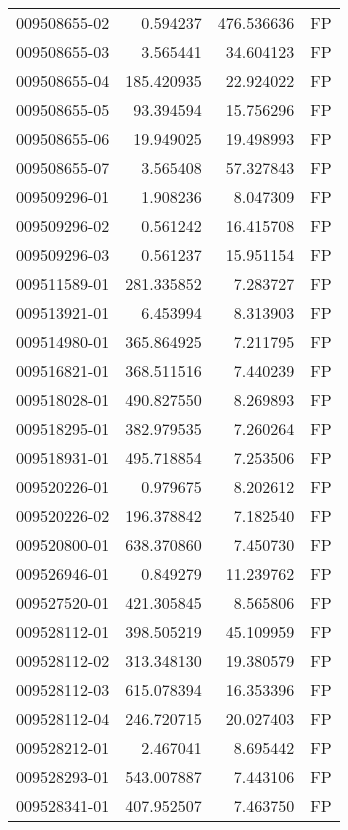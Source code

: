 \begin{tabular}{lrrl}
009508655-02 &    0.594237 &     476.536636 &   FP \\
009508655-03 &    3.565441 &      34.604123 &   FP \\
009508655-04 &  185.420935 &      22.924022 &   FP \\
009508655-05 &   93.394594 &      15.756296 &   FP \\
009508655-06 &   19.949025 &      19.498993 &   FP \\
009508655-07 &    3.565408 &      57.327843 &   FP \\
009509296-01 &    1.908236 &       8.047309 &   FP \\
009509296-02 &    0.561242 &      16.415708 &   FP \\
009509296-03 &    0.561237 &      15.951154 &   FP \\
009511589-01 &  281.335852 &       7.283727 &   FP \\
009513921-01 &    6.453994 &       8.313903 &   FP \\
009514980-01 &  365.864925 &       7.211795 &   FP \\
009516821-01 &  368.511516 &       7.440239 &   FP \\
009518028-01 &  490.827550 &       8.269893 &   FP \\
009518295-01 &  382.979535 &       7.260264 &   FP \\
009518931-01 &  495.718854 &       7.253506 &   FP \\
009520226-01 &    0.979675 &       8.202612 &   FP \\
009520226-02 &  196.378842 &       7.182540 &   FP \\
009520800-01 &  638.370860 &       7.450730 &   FP \\
009526946-01 &    0.849279 &      11.239762 &   FP \\
009527520-01 &  421.305845 &       8.565806 &   FP \\
009528112-01 &  398.505219 &      45.109959 &   FP \\
009528112-02 &  313.348130 &      19.380579 &   FP \\
009528112-03 &  615.078394 &      16.353396 &   FP \\
009528112-04 &  246.720715 &      20.027403 &   FP \\
009528212-01 &    2.467041 &       8.695442 &   FP \\
009528293-01 &  543.007887 &       7.443106 &   FP \\
009528341-01 &  407.952507 &       7.463750 &   FP \\

\end{tabular}
